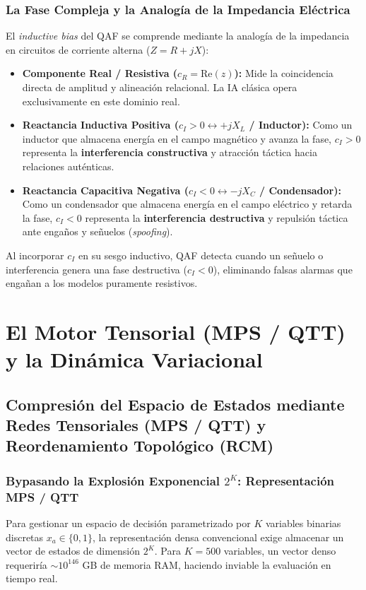 \documentclass[11pt,a4paper,oneside]{report}
\begin{document}
\section{La Fase Compleja y la Analogía de la Impedancia Eléctrica}
El \emph{inductive bias} del QAF se comprende mediante la analogía de la impedancia en circuitos de corriente alterna ($Z = R + jX$):
\begin{itemize}
    \item \textbf{Componente Real / Resistiva ($c_R = \text{Re}(z)$):} Mide la coincidencia directa de amplitud y alineación relacional. La IA clásica opera exclusivamente en este dominio real.
    \item \textbf{Reactancia Inductiva Positiva ($c_I > 0 \leftrightarrow +jX_L$ / Inductor):} Como un inductor que almacena energía en el campo magnético y avanza la fase, $c_I > 0$ representa la \textbf{interferencia constructiva} y atracción táctica hacia relaciones auténticas.
    \item \textbf{Reactancia Capacitiva Negativa ($c_I < 0 \leftrightarrow -jX_C$ / Condensador):} Como un condensador que almacena energía en el campo eléctrico y retarda la fase, $c_I < 0$ representa la \textbf{interferencia destructiva} y repulsión táctica ante engaños y señuelos (\emph{spoofing}).
\end{itemize}
Al incorporar $c_I$ en su sesgo inductivo, QAF detecta cuando un señuelo o interferencia genera una fase destructiva ($c_I < 0$), eliminando falsas alarmas que engañan a los modelos puramente resistivos.


\part{El Motor Tensorial (MPS / QTT) y la Dinámica Variacional}

\chapter{Compresión del Espacio de Estados mediante Redes Tensoriales (MPS / QTT) y Reordenamiento Topológico (RCM)}
\label{cap:redes_tensoriales_rcm}

\section{Bypasando la Explosión Exponencial $2^K$: Representación MPS / QTT}
Para gestionar un espacio de decisión parametrizado por $K$ variables binarias discretas $x_a \in \{0, 1\}$, la representación densa convencional exige almacenar un vector de estados de dimensión $2^K$. Para $K = 500$ variables, un vector denso requeriría $\sim 10^{146}$ GB de memoria RAM, haciendo inviable la evaluación en tiempo real.
\end{document}
